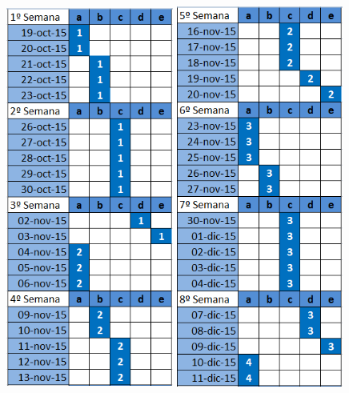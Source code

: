 \begin{figure}[h!]
	\includegraphics[width=5.5cm, height=13cm]{xp2.PNG}
	\includegraphics[width=5.5cm, height=13cm]{xp3.PNG}

\end{figure}
